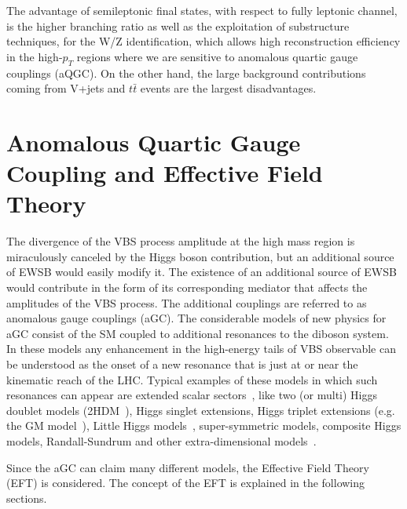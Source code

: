 The advantage of semileptonic final states, with respect to fully leptonic channel, is the higher branching ratio as well as the exploitation of 
substructure techniques, for the W/Z identification, which allows high reconstruction efficiency in the high-$p_T$ regions where we are sensitive to anomalous quartic gauge couplings (aQGC). On the other hand, the large background contributions coming from V+jets and $t\bar{t}$ events are the largest disadvantages. 

\section{Anomalous Quartic Gauge Coupling and Effective Field Theory}
The divergence of the VBS process amplitude at the high mass region is miraculously canceled by the Higgs boson contribution, but an additional source of EWSB would easily modify it. 
The existence of an additional source of EWSB would contribute in the form of its corresponding mediator that affects the amplitudes of the VBS process. 
The additional couplings are referred to as anomalous gauge couplings (aGC). 
The considerable models of new physics for aGC consist of the SM coupled to additional resonances to the diboson system.
In these models any enhancement in the high-energy tails of VBS observable can be understood as the onset of a new resonance that is just at or near the kinematic reach of the LHC.
Typical examples of these models in which such resonances can appear are extended scalar sectors~\cite{https://doi.org/10.48550/arxiv.2005.09889}, like two (or multi) Higgs doublet models (2HDM~\cite{BRANCO20121}), Higgs singlet extensions, Higgs triplet extensions (e.g. the GM model~\cite{PhysRevD.90.015007}), Little Higgs models~\cite{PhysRevD.71.015008}, super-symmetric models, composite Higgs models, Randall-Sundrum and other extra-dimensional models~\cite{cite-key}.

Since the aGC can claim many different models, the Effective Field Theory (EFT) is considered. 
The concept of the EFT is explained in the following sections.
